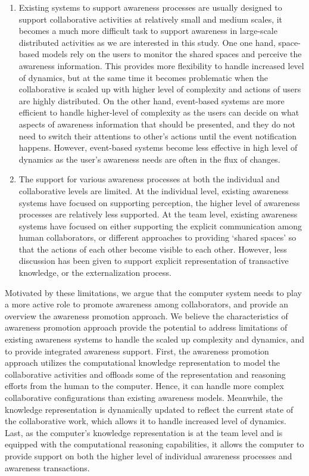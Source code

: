 \begin{enumerate}
   \item Existing systems to support awareness processes are usually designed to support collaborative activities at relatively small and medium scales, it becomes a much more difficult task to support awareness in large-scale distributed activities as we are interested in this study. One one hand, space-based models rely on the users to monitor the shared spaces and perceive the awareness information. This provides more flexibility to handle increased level of dynamics, but at the same time it becomes  problematic when the collaborative is scaled up with higher level of complexity and actions of users are highly distributed. On the other hand, event-based systems are more efficient to handle higher-level of complexity as the users can decide on what aspects of awareness information that should be presented, and they do not need to switch their attentions to other’s actions until the event notification happens. However, event-based systems become less effective in high level of dynamics as the user's awareness needs are often in the flux of changes.
   \item The support for various awareness processes at both the individual and collaborative levels are limited. At the individual level, existing awareness systems have focused on supporting perception, the higher level of awareness processes are relatively less supported. At the team level, existing awareness systems have focused on either supporting the explicit communication among human collaborators, or different approaches to providing ‘shared spaces’ so that the actions of each other become visible to each other. However, less discussion has been given to support explicit representation of transactive knowledge, or the externalization process.
\end{enumerate}

Motivated by these limitations, we argue that the computer system needs to play a more active role to promote awareness among collaborators, and provide an overview the awareness promotion approach. We believe the characteristics of awareness promotion approach provide the potential to address limitations of existing awareness systems to handle the scaled up complexity and dynamics, and to provide integrated awareness support. First, the awareness promotion approach utilizes the computational knowledge representation to model the collaborative activities and offloads some of the representation and reasoning efforts from the human to the computer. Hence, it can  handle more complex collaborative configurations than existing awareness models. Meanwhile, the knowledge representation is dynamically updated to reflect the current state of the collaborative work, which allows it to handle increased level of dynamics. Last, as the computer's knowledge representation is at the team level and is equipped with the computational reasoning capabilities, it allows the computer to provide support on both the higher level of individual awareness processes and awareness transactions.

